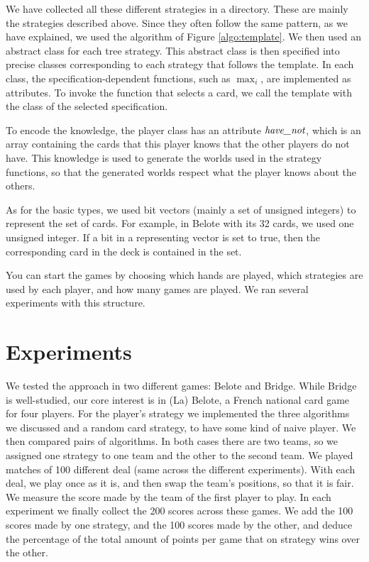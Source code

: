 \documentclass[runningheads]{llncs}
\begin{document}
We have collected all these different strategies in a directory. These are mainly the strategies described above. Since they often follow the same pattern, as we have explained, we used the algorithm of Figure \ref{algo:template}. We then used an abstract class for each tree strategy. This abstract class is then specified into precise classes corresponding to each strategy that follows the template. In each class, the specification-dependent functions, such as $\max_i$, are implemented as attributes. To invoke the function that selects a card, we call the template with the class of the selected specification. 

To encode the knowledge, the player class has an attribute $\mbox{\em have\_not}$, which is an array containing the cards that this player knows that the other players do not have. This knowledge is used to generate the worlds used in the strategy functions, so that the generated worlds respect what the player knows about the others. 

As for the basic types, we used bit vectors (mainly a set of unsigned integers) to represent the set of cards. For example, in Belote with its 32 cards, we used one unsigned integer. If a bit in a representing vector is set to true, then the corresponding card in the deck is contained in the set. 

You can start the games by choosing which hands are played, which strategies are used by each player, and how many games are played. We ran several experiments with this structure. 

\section{Experiments}

We tested the approach in two different games: Belote and Bridge. 
While Bridge is well-studied, our core interest is in (La) Belote, a French national card game for four players. %
%
For the player's strategy we implemented the three algorithms we discussed and a random card strategy, to have some kind of naive player. We then compared pairs of algorithms. In both cases there are two teams, so we assigned one strategy to one team and the other to the second team. We played matches of 100 different deal (same across the different experiments). With each deal, we play once as it is, and then swap the team's positions, so that it is fair. We measure the score made by the team of the first player to play. In each experiment we finally collect the 200 scores across these games. We add the 100 scores made by one strategy, and the 100 scores made by the other, and deduce the percentage of the total amount of points per game that on strategy wins over the other. 
\end{document}
